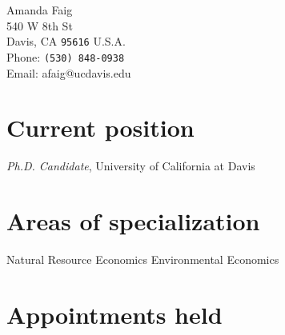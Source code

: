 \documentclass{article} %
\begin{document}

{\LARGE Amanda Faig}\\[1cm] %
540 W 8th St\\ %
Davis, CA \texttt{95616}
U.S.A.\\[.2cm]
Phone: \texttt{(530) 848-0938}\\ %
Email: afaig@ucdavis.edu\\ %





\section*{Current position}

\emph{Ph.D. Candidate}, University of California at Davis %


\section*{Areas of specialization}

Natural Resource Economics
Environmental Economics %


\section*{Appointments held}
\end{document}

